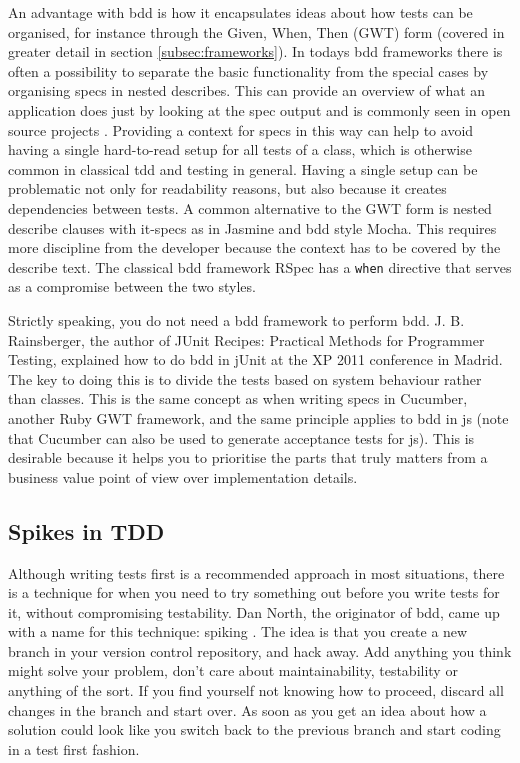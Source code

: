 \documentclass[11pt]{article}
\begin{document}
An advantage with \gls{bdd} is how it encapsulates ideas about how tests can be organised, for instance through the Given, When, Then (GWT) form (covered in greater detail in section \ref{subsec:frameworks}). In todays \gls{bdd} frameworks there is often a possibility to separate the basic functionality from the special cases by organising \glspl{spec} in nested describes. This can provide an overview of what an application does just by looking at the \gls{spec} output and is commonly seen in open source projects \cite[question~42]{Stenmark}. Providing a context for \glspl{spec} in this way can help to avoid having a single hard-to-read setup for all tests of a class, which is otherwise common in classical \gls{tdd} and testing in general. Having a single setup can be problematic not only for readability reasons, but also because it creates dependencies between tests. A common alternative to the GWT form is nested describe clauses with it-specs as in Jasmine and \gls{bdd} style Mocha. This requires more discipline from the developer because the context has to be covered by the describe text. The classical \gls{bdd} framework RSpec has a \texttt{when} directive that serves as a compromise between the two styles. \cite[question~19]{Ahnve}

Strictly speaking, you do not need a \gls{bdd} framework to perform \gls{bdd}. J. B. Rainsberger, the author of JUnit Recipes: Practical Methods for Programmer Testing, explained how to do \gls{bdd} in jUnit at the XP 2011 conference in Madrid. The key to doing this is to divide the tests based on system behaviour rather than classes. This is the same concept as when writing \glspl{spec} in Cucumber, another Ruby GWT framework, and the same principle applies to \gls{bdd} in \gls{js} (note that Cucumber can also be used to generate acceptance tests for \gls{js}). This is desirable because it helps you to prioritise the parts that truly matters from a business value point of view over implementation details. \cite[question~20]{Ahnve}

\subsection{Spikes in TDD}
\label{subsec:spikes}

Although writing tests first is a recommended approach in most situations, there is a technique for when you need to try something out before you write tests for it, without compromising testability. Dan North, the originator of \gls{bdd}, came up with a name for this technique: spiking \cite{TwitterDanNorth}. The idea is that you create a new branch in your version control repository, and hack away. Add anything you think might solve your problem, don't care about maintainability, testability or anything of the sort. If you find yourself not knowing how to proceed, discard all changes in the branch and start over. As soon as you get an idea about how a solution could look like you switch back to the previous branch and start coding in a test first fashion. \cite[question~59]{Edelstam}
\end{document}
